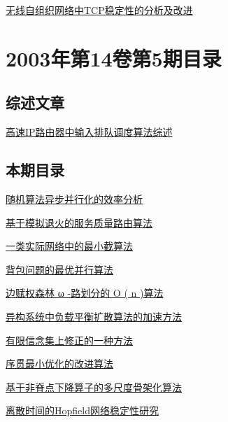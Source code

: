 \documentclass[a4paper]{article}
\begin{document}
\href{http://www.jos.org.cn/ch/reader/download_pdf.aspx?file_no=20030621&year_id=2003&quarter_id=6&falg=1}{无线自组织网络中TCP稳定性的分析及改进}


\section{\textbf{2003年第14卷第5期目录}}
\subsection{综述文章}
\href{http://www.jos.org.cn/ch/reader/download_pdf.aspx?file_no=20030521&year_id=2003&quarter_id=5&falg=1}{高速IP路由器中输入排队调度算法综述}

\subsection{本期目录}
\href{http://www.jos.org.cn/ch/reader/download_pdf.aspx?file_no=20030501&year_id=2003&quarter_id=5&falg=1}{随机算法异步并行化的效率分析}

\href{http://www.jos.org.cn/ch/reader/download_pdf.aspx?file_no=20030502&year_id=2003&quarter_id=5&falg=1}{基于模拟退火的服务质量路由算法}

\href{http://www.jos.org.cn/ch/reader/download_pdf.aspx?file_no=20030503&year_id=2003&quarter_id=5&falg=1}{一类实际网络中的最小截算法}

\href{http://www.jos.org.cn/ch/reader/download_pdf.aspx?file_no=20030504&year_id=2003&quarter_id=5&falg=1}{背包问题的最优并行算法}

\href{http://www.jos.org.cn/ch/reader/download_pdf.aspx?file_no=20030505&year_id=2003&quarter_id=5&falg=1}{边赋权森林 ω -路划分的 O ( n )算法}

\href{http://www.jos.org.cn/ch/reader/download_pdf.aspx?file_no=20030506&year_id=2003&quarter_id=5&falg=1}{异构系统中负载平衡扩散算法的加速方法}

\href{http://www.jos.org.cn/ch/reader/download_pdf.aspx?file_no=20030507&year_id=2003&quarter_id=5&falg=1}{有限信念集上修正的一种方法}

\href{http://www.jos.org.cn/ch/reader/download_pdf.aspx?file_no=20030508&year_id=2003&quarter_id=5&falg=1}{序贯最小优化的改进算法}

\href{http://www.jos.org.cn/ch/reader/download_pdf.aspx?file_no=20030509&year_id=2003&quarter_id=5&falg=1}{基于非脊点下降算子的多尺度骨架化算法}

\href{http://www.jos.org.cn/ch/reader/download_pdf.aspx?file_no=20030510&year_id=2003&quarter_id=5&falg=1}{离散时间的Hopfield网络稳定性研究}
\end{document}

